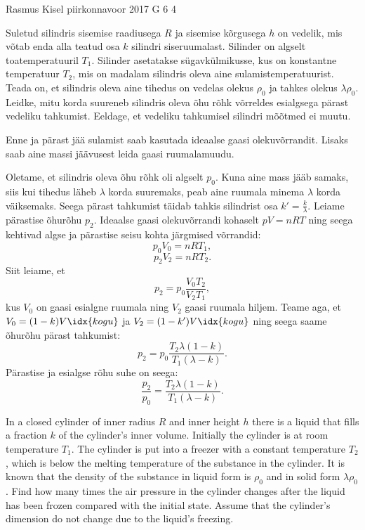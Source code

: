 {Rasmus Kisel} %
{piirkonnavoor} %
{2017} %
{G 6} %
{4} %
{
\ifStatement
Suletud silindris sisemise raadiusega $R$ ja sisemise kõrgusega $h$ on vedelik, mis võtab enda alla teatud osa $k$ silindri siseruumalast. Silinder on algselt toatemperatuuril $T_{1}$. Silinder asetatakse sügavkülmikusse, kus on konstantne temperatuur $T_{2}$, mis on madalam silindris oleva aine sulamistemperatuurist. Teada on, et silindris oleva aine tihedus on vedelas olekus $\rho_0$ ja tahkes olekus $\lambda\rho_0$. Leidke, mitu korda suureneb silindris oleva õhu rõhk võrreldes esialgsega pärast vedeliku tahkumist. Eeldage, et vedeliku tahkumisel silindri mõõtmed ei muutu.
\fi


\ifHint
Enne ja pärast jää sulamist saab kasutada ideaalse gaasi olekuvõrrandit. Lisaks saab aine massi jäävusest leida gaasi ruumalamuudu.
\fi


\ifSolution
Oletame, et silindris oleva õhu rõhk oli algselt $p_{0}$. Kuna aine mass jääb samaks, siis kui tihedus läheb $\lambda$ korda suuremaks, peab aine ruumala minema $\lambda$ korda väiksemaks. Seega pärast tahkumist täidab tahkis silindrist osa $k'=\frac{k}{\lambda}$. Leiame pärastise õhurõhu $p_{2}$. Ideaalse gaasi olekuvõrrandi kohaselt $pV=nRT$ ning seega kehtivad algse ja pärastise seisu kohta järgmised võrrandid:
\begin{equation*}
p_{0}V_{0}=nRT_{1},
\end{equation*}
\begin{equation*}
p_{2}V_{2}=nRT_{2}.
\end{equation*}
Siit leiame, et
\[
p_{2}=p_{0}\frac{V_{0}T_{2}}{V_{2}T_{1}},
\]
kus $V_{0}$ on gaasi esialgne ruumala ning $V_{2}$ gaasi ruumala hiljem. Teame aga, et $V_{0}=(1-k)V\idx{kogu}$ ja $V_{2}=(1-k')V\idx{kogu}$ ning seega saame õhurõhu pärast tahkumist:
\begin{equation*}
p_{2}=p_{0}\frac{T_{2}\lambda (1-k)}{T_{1}(\lambda-k)}.
\end{equation*}
Pärastise ja esialgse rõhu suhe on seega:
\begin{equation*}
\frac{p_{2}}{p_{0}}=\frac{T_{2}\lambda(1-k)}{T_{1}(\lambda-k)}.
\end{equation*}
\fi


\ifEngStatement
In a closed cylinder of inner radius $R$ and inner height $h$ there is a liquid that fills a fraction $k$ of the cylinder's inner volume. Initially the cylinder is at room temperature $T_{1}$. The cylinder is put into a freezer with a constant temperature $T_{2}$, which is below the melting temperature of the substance in the cylinder. It is known that the density of the substance in liquid form is $\rho_0$ and in solid form $\lambda\rho_0$. Find how many times the air pressure in the cylinder changes after the liquid has been frozen compared with the initial state. Assume that the cylinder's dimension do not change due to the liquid’s freezing.
\fi


}
